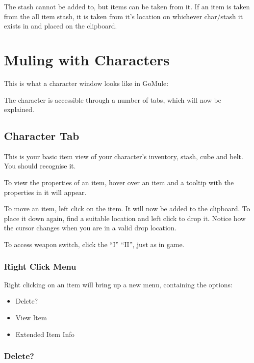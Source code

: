 \documentclass[a4paper,10pt]{article}
\begin{document}
The stash cannot be added to, but items can be taken from it. If an item is taken from the all item stash, it is taken from it's location on whichever char/stash it exists in and placed on the clipboard. 

\section{Muling with Characters}

This is what a character window looks like in GoMule:

\begin{figure}[htp]
\centering
{}
\end{figure}

The character is accessible through a number of tabs, which will now be explained.

\subsection{Character Tab}

This is your basic item view of your character's inventory, stash, cube and belt. You should recognise it. 

To view the properties of an item, hover over an item and a tooltip with the properties in it will appear.

To move an item, left click on the item. It will now be added to the clipboard. To place it down again, find a suitable location and left click to drop it. Notice how the cursor changes when you are in a valid drop location.

To access weapon switch, click the ``I'' ``II'', just as in game.

\subsubsection{Right Click Menu}

Right clicking on an item will bring up a new menu, containing the options:

\begin{itemize}
 \item Delete?
\item View Item
\item Extended Item Info
\end{itemize}

\subsubsection{Delete?}
\end{document}
